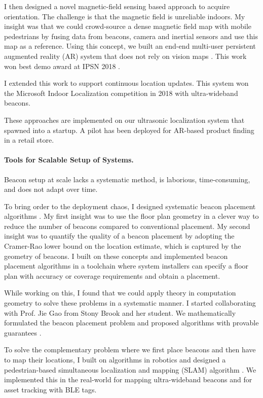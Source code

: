 \documentclass[10pt]{article}
\begin{document}
I then designed a novel magnetic-field sensing based approach to acquire orientation. The challenge is that the magnetic field is unreliable indoors. My insight was that we could crowd-source a dense magnetic field map with mobile pedestrians by fusing data from beacons, camera and inertial sensors and use this map as a reference.  Using this concept, we built an end-end multi-user persistent augmented reality (AR) system that does not rely on vision maps \cite{mobileAR}. This work won best demo award at IPSN 2018 \cite{rajagopal2018welcome}. 

I extended this work to support continuous location updates. This system won the Microsoft Indoor Localization competition in 2018 with ultra-wideband beacons.


These approaches are implemented on our ultrasonic localization system that spawned into a startup. A pilot has been deployed for AR-based product finding in a retail store. 

\paragraph{Tools for Scalable Setup of Systems.  }
Beacon setup at scale lacks a systematic method, is laborious, time-consuming, and does not adapt over time. 

To bring order to the deployment chaos, I designed systematic beacon placement algorithms \cite{rajagopal2016beacon}. 
My first insight was to use the floor plan geometry in a clever way to reduce the number of beacons compared to conventional placement. 
My second insight was to quantify the quality of a beacon placement by adopting the Cramer-Rao lower bound on the location estimate, which is captured by the geometry of beacons. I built on these concepts and implemented beacon placement algorithms in a toolchain where system installers can specify a floor plan with accuracy or coverage requirements and obtain a placement. 

While working on this, I found that we could apply theory in computation geometry to solve these problems in a systematic manner.  
I started collaborating with Prof. Jie Gao from Stony Brook and her student. 
We mathematically formulated the beacon placement problem and proposed algorithms with provable guarantees \cite{beaconplacementtheory}.  

To solve the complementary problem where we first place beacons and then have to map their locations, I built on algorithms in robotics and designed a pedestrian-based simultaneous localization and mapping (SLAM) algorithm \cite{mobileAR}. We implemented this in the real-world for mapping ultra-wideband beacons and for asset tracking with BLE tags. 
\end{document}
